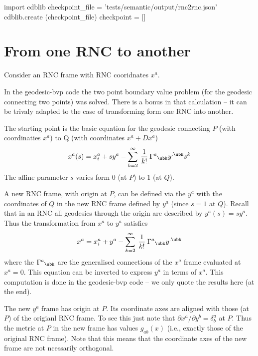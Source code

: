 \documentclass[12pt]{cdblatex}
\begin{document}

\bgroup
{}
\begin{cadabra}
   import cdblib
   checkpoint_file = 'tests/semantic/output/rnc2rnc.json'
   cdblib.create (checkpoint_file)
   checkpoint = []
\end{cadabra}
\egroup

\section*{From one RNC to another}

Consider an RNC frame with RNC cooridnates $x^{a}$.

In the {\tts geodesic-bvp} code the two point boundary value problem (for the geodesic connecting
two points) was solved. There is a bonus in that calculation -- it can be trivaly adapted to the
case of transforming form one RNC into another.

The starting point is the basic equation for the geodesic connecting $P$ (with coordinaties
$x^{a}$) to Q (with coordinates $x^{a} + Dx^{a}$)
\begin{equation*}
   x^a(s) = x^a_i + s y^a - \sum_{k=2}^\infty\>\frac{1}{k!}\>\Gamma^{a}{}_{\ubk}y^{.\ubk} s^k
\end{equation*}
The affine parameter $s$ varies form 0 (at $P$) to 1 (at $Q$).

A new RNC frame, with origin at $P$, can be defined via the $y^{a}$ with the coordinates of $Q$ in
the new RNC frame defined by $y^{a}$ (since $s=1$ at $Q$). Recall that in an RNC all geodesics
through the origin are described by $y^{a}(s) = s y^{a}$. Thus the transformation from $x^a$ to
$y^a$ satisfies
\begin{equation*}
   x^a = x^a_i + y^a - \sum_{k=2}^\infty\>\frac{1}{k!}\>\Gamma^{a}{}_{\ubk}y^{.\ubk}
\end{equation*}
where the $\Gamma^{a}{}_{\ubk}$ are the generalised connections of the $x^a$ frame evaluated at
$x^a=0$. This equation can be inverted to express $y^a$ in terms of $x^a$. This computation is
done in the {\tts geodesic-bvp} code -- we only quote the results here (at the end).

The new $y^a$ frame has origin at $P$. Its coordinate axes are aligned with those (at $P$) of the
origianl RNC frame. To see this just note that $\partial x^a/\partial y^b = \delta^a_b$ at $P$.
Thus the metric at $P$ in the new frame has values $g_{ab}(x)$ (i.e., exactly those of the
original RNC frame). Note that this means that the coordinate axes of the new frame are not
ncessarily orthogonal.
\end{document}
